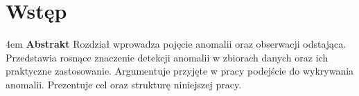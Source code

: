 \chapter{Wstęp}
\label{chap:wstep}

\begingroup
\leftskip4em
\rightskip\leftskip
\noindent 
\textbf{Abstrakt} Rozdział wprowadza pojęcie anomalii oraz obserwacji odstająca. Przedstawia rosnące znaczenie detekcji anomalii w zbiorach danych oraz ich praktyczne zastosowanie. Argumentuje przyjęte w pracy podejście do wykrywania anomalii. Prezentuje cel oraz strukturę niniejszej pracy.\par
\endgroup



